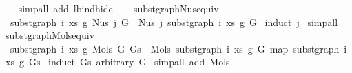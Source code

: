 \begin{isabellebody}
\ \ \isamarkupfalse%
\ {\isacharparenleft}{\kern0pt}simp{\isacharunderscore}{\kern0pt}all\ add{\isacharcolon}{\kern0pt}\ lbind{\isacharunderscore}{\kern0pt}hide{\isacharparenright}{\kern0pt}\isanewline
\ \ \isamarkupfalse%
\isanewline
{}\isamarkupfalse%
%
\endisatagproof
{\isafoldproof}%
%
\isadelimproof
%
\endisadelimproof
%
\isadelimdocument
%
\endisadelimdocument
%
\isatagdocument
%
\isamarkuptrue%
%
\endisatagdocument
{\isafolddocument}%
%
\isadelimdocument
%
\endisadelimdocument
{}\isamarkupfalse%
\ subst{\isacharunderscore}{\kern0pt}graph{\isacharunderscore}{\kern0pt}Nus{}{\isacharunderscore}{\kern0pt}equiv{\isacharcolon}{\kern0pt}\isanewline
\ \ {\isachardoublequoteopen}subst{\isacharunderscore}{\kern0pt}graph\ i\ xs\ g{}\ {\isacharparenleft}{\kern0pt}Nus{}\ j\ G{\isacharparenright}{\kern0pt}\ {\isacharequal}{\kern0pt}\ Nus{}\ j\ {\isacharparenleft}{\kern0pt}subst{\isacharunderscore}{\kern0pt}graph\ i\ xs\ g{}\ G{\isacharparenright}{\kern0pt}{\isachardoublequoteclose}\isanewline
%
\isadelimproof
%
\endisadelimproof
%
\isatagproof
{}\isamarkupfalse%
\ {\isacharparenleft}{\kern0pt}induct\ j{\isacharparenright}{\kern0pt}\isanewline
{}\isamarkupfalse%
\ simp{\isacharunderscore}{\kern0pt}all%
\endisatagproof
{\isafoldproof}%
%
\isadelimproof
\isanewline
%
\endisadelimproof
\isanewline
\isanewline
{}\isamarkupfalse%
\ subst{\isacharunderscore}{\kern0pt}graph{\isacharunderscore}{\kern0pt}Mols{}{\isacharunderscore}{\kern0pt}equiv{\isacharcolon}{\kern0pt}\isanewline
\ \ {\isachardoublequoteopen}subst{\isacharunderscore}{\kern0pt}graph\ i\ xs\ g{}\ {\isacharparenleft}{\kern0pt}Mols{}\ G\ Gs{\isacharparenright}{\kern0pt}\ {\isacharequal}{\kern0pt}\ Mols{}\ {\isacharparenleft}{\kern0pt}subst{\isacharunderscore}{\kern0pt}graph\ i\ xs\ g{}\ G{\isacharparenright}{\kern0pt}\ {\isacharparenleft}{\kern0pt}map\ {\isacharparenleft}{\kern0pt}subst{\isacharunderscore}{\kern0pt}graph\ i\ xs\ g{}{\isacharparenright}{\kern0pt}\ Gs{\isacharparenright}{\kern0pt}{\isachardoublequoteclose}\isanewline
%
\isadelimproof
%
\endisadelimproof
%
\isatagproof
{}\isamarkupfalse%
\ {\isacharparenleft}{\kern0pt}induct\ Gs\ arbitrary{\isacharcolon}{\kern0pt}\ G{\isacharparenright}{\kern0pt}\isanewline
{}\isamarkupfalse%
\ {\isacharparenleft}{\kern0pt}simp{\isacharunderscore}{\kern0pt}all\ add{\isacharcolon}{\kern0pt}\ Mols{}{\isacharparenright}{\kern0pt}%

\end{isabellebody}
